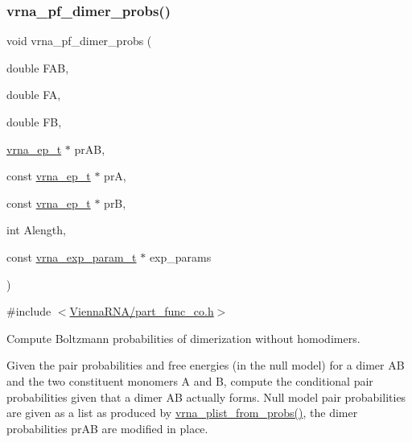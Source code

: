 \subsubsection{\texorpdfstring{vrna\+\_\+pf\+\_\+dimer\+\_\+probs()}{vrna\_pf\_dimer\_probs()}}
{\footnotesize\ttfamily void vrna\+\_\+pf\+\_\+dimer\+\_\+probs (\begin{DoxyParamCaption}\item[{double}]{F\+AB,  }\item[{double}]{FA,  }\item[{double}]{FB,  }\item[{\hyperlink{group__struct__utils_gab9ac98ab55ded9fb90043b024b915aca}{vrna\+\_\+ep\+\_\+t} $\ast$}]{pr\+AB,  }\item[{const \hyperlink{group__struct__utils_gab9ac98ab55ded9fb90043b024b915aca}{vrna\+\_\+ep\+\_\+t} $\ast$}]{prA,  }\item[{const \hyperlink{group__struct__utils_gab9ac98ab55ded9fb90043b024b915aca}{vrna\+\_\+ep\+\_\+t} $\ast$}]{prB,  }\item[{int}]{Alength,  }\item[{const \hyperlink{group__energy__parameters_ga01d8b92fe734df8d79a6169482c7d8d8}{vrna\+\_\+exp\+\_\+param\+\_\+t} $\ast$}]{exp\+\_\+params }\end{DoxyParamCaption})}



{\ttfamily \#include $<$\hyperlink{part__func__co_8h}{Vienna\+R\+N\+A/part\+\_\+func\+\_\+co.\+h}$>$}



Compute Boltzmann probabilities of dimerization without homodimers. 

Given the pair probabilities and free energies (in the null model) for a dimer AB and the two constituent monomers A and B, compute the conditional pair probabilities given that a dimer AB actually forms. Null model pair probabilities are given as a list as produced by \hyperlink{group__pf__fold_ga94f6efc0b8d8712b023452794a0a5bd2}{vrna\+\_\+plist\+\_\+from\+\_\+probs()}, the dimer probabilities \textquotesingle{}pr\+AB\textquotesingle{} are modified in place.


